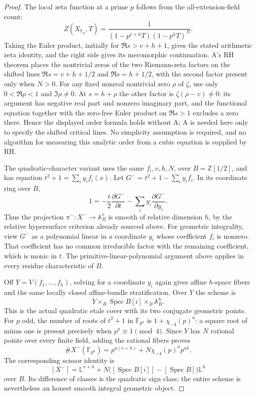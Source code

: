 \begin{proof}
The local zeta function at a prime $p$ follows from the all-extension-field count:
\[
 Z(X_{\mathbb F_p},T)
       =\frac{1}{(1-p^{v+h}T)(1-p^hT)^N}.
\]
Taking the Euler product, initially for $\Re s>v+h+1$, gives the stated arithmetic zeta identity, and the right side gives its meromorphic continuation. A's RH theorem places the nontrivial zeros of the two Riemann-zeta factors on the shifted lines $\Re s=v+h+1/2$ and $\Re s=h+1/2$, with the second factor present only when $N>0$. For any fixed nonreal nontrivial zero $\rho$ of $\zeta$, use only $0<\Re\rho<1$ and $\Im\rho\ne0$. At $s=h+\rho$ the other factor is $\zeta(\rho-v)\ne0$: its argument has negative real part and nonzero imaginary part, and the functional equation together with the zero-free Euler product on $\Re s>1$ excludes a zero there. Hence the displayed order formula holds without A; A is needed here only to specify the shifted critical lines. No simplicity assumption is required, and no algorithm for measuring this analytic order from a cubic equation is supplied by RH.

The quadratic-character variant uses the same $f_i,v,h,N$, over $B=\mathbb Z[1/2]$, and has equation $t^2+1=\sum_i y_i f_i(x)$. Let $G^-=t^2+1-\sum_i y_i f_i$. In its coordinate ring over $B$,
\[
 1=-\frac t2\frac{\partial G^-}{\partial t}
                     -\sum_i y_i\frac{\partial G^-}{\partial y_i}.
\]
Thus the projection $\pi^-:X^-\to\mathbb A^v_B$ is smooth of relative dimension $h$, by the relative hypersurface criterion already sourced above. For geometric integrality, view $G^-$ as a polynomial linear in a coordinate $y_i$ whose coefficient $f_i$ is nonzero. That coefficient has no common irreducible factor with the remaining coefficient, which is monic in $t$. The primitive-linear-polynomial argument above applies in every residue characteristic of $B$.

Off $Y=V(f_1,\ldots,f_h)$, solving for a coordinate $y_i$ again gives affine $h$-space fibers and the same locally closed affine-bundle stratification. Over $Y$ the scheme is
\[
       Y\times_B\operatorname{Spec}B[i]\times_B\mathbb A^h_B.
\]
This is the actual quadratic etale cover with its two conjugate geometric points. For $p$ odd, the number of roots of $t^2+1$ in $\mathbb F_{p^a}$ is $1+\chi_{-4}(p)^a$: a square root of minus one is present precisely when $p^a\equiv1\pmod4$. Since $Y$ has $N$ rational points over every finite field, adding the rational fibers proves
\[
 \#X^-(\mathbb F_{p^a})=p^{a(v+h)}+N\chi_{-4}(p)^a p^{ah}.
\] The corresponding scissor identity is
\[
 [X^-]=\mathbb L^{v+h}
       +N\bigl([\operatorname{Spec}B[i]]-[\operatorname{Spec}B]\bigr)\mathbb L^h
\]
over $B$. Its difference of classes is the quadratic sign class; the entire scheme is nevertheless an honest smooth integral geometric object.


\end{proof}
